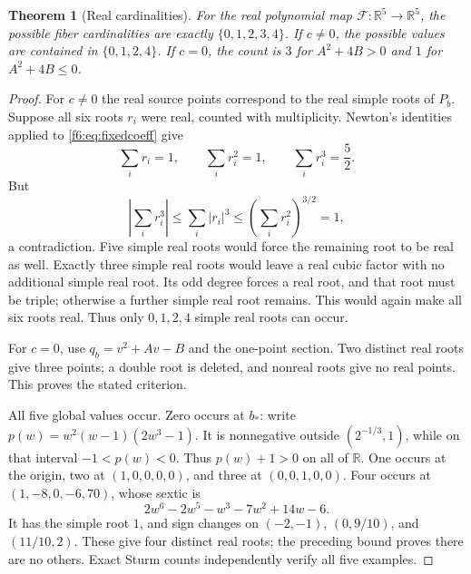 \documentclass[11pt,a4paper]{article}
\newtheorem{theorem}{Theorem}[section]
\theoremstyle{definition}
\newcommand{\R}{\mathbb R}
\newcommand{\F}{\mathcal F}
\begin{document}
\begin{theorem}[Real cardinalities]\label{f6:thm:real}
For the real polynomial map $\F:\R^5\to\R^5$, the possible fiber
cardinalities are exactly $\{0,1,2,3,4\}$. If $c\ne0$, the possible
values are contained in $\{0,1,2,4\}$. If $c=0$, the count is $3$ for
$A^2+4B>0$ and $1$ for $A^2+4B\le0$.
\end{theorem}
\begin{proof}
For $c\ne0$ the real source points correspond to the real simple roots
of $P_b$. Suppose all six roots $r_i$ were real, counted with
multiplicity. Newton's identities applied to \eqref{f6:eq:fixedcoeff} give
\[
 \sum_i r_i=1,\qquad \sum_i r_i^2=1,\qquad
 \sum_i r_i^3=\frac52.
\]
But
\[
 \left|\sum_i r_i^3\right|\le\sum_i|r_i|^3
 \le\left(\sum_i r_i^2\right)^{3/2}=1,
\]
a contradiction. Five simple real roots would force the remaining root
to be real as well. Exactly three simple real roots would leave a
real cubic factor with no additional simple real root. Its odd degree
forces a real root, and that root must be triple; otherwise a further
simple real root remains. This would again make all six roots real.
Thus only $0,1,2,4$ simple real roots can occur.

For $c=0$, use $q_b=v^2+Av-B$ and the one-point section. Two distinct
real roots give three points; a double root is deleted, and nonreal
roots give no real points. This proves the stated criterion.

All five global values occur. Zero occurs at $b_*$: write
$p(w)=w^2(w-1)(2w^3-1)$. It is nonnegative outside
$(2^{-1/3},1)$, while on that interval $-1<p(w)<0$. Thus $p(w)+1>0$
on all of $\R$. One occurs at the origin, two at $(1,0,0,0,0)$, and
three at $(0,0,1,0,0)$. Four occurs at $(1,-8,0,-6,70)$, whose sextic is
\[
 2w^6-2w^5-w^3-7w^2+14w-6.
\]
It has the simple root $1$, and sign changes on
$(-2,-1)$, $(0,9/10)$, and $(11/10,2)$. These give four distinct real
roots; the preceding bound proves there are no others. Exact Sturm
counts independently verify all five examples.
\end{proof}
\end{document}
